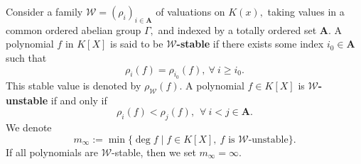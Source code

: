 \documentclass[11pt]{amsart}
\theoremstyle{definition}
\theoremstyle{remark}
\numberwithin{equation}{section}
\begin{document}
Consider a family $\mathcal{W}=(\rho_i)_{i\in\mathbf{A}}$ of valuations on $K(x),$  taking values in a common ordered abelian group $\Gamma,$   and indexed by a totally ordered set $\mathbf{A}.$ 
A polynomial $f$ in $K[X]$ is said to be {\bf $\mathcal{W}$-stable}  if there exists some index $i_0\in\mathbf{A}$ such that
$$\rho_i(f)=\rho_{i_0}(f),~ \forall~ i\geq i_0.$$  This stable value is denoted by $\rho_\mathcal{W}(f).$
%
A polynomial $f\in K[X]$  is {\bf $\mathcal{W}$-unstable} if and only if  
$$\rho_i(f)<\rho_j(f),\hspace{5pt} \forall~ i<j\in\mathbf{A}.$$  
We denote 
$$m_{\infty}:=\min\{\deg f\mid f\in K[X],~\text{$f$ is $\mathcal{W}$-unstable}\}.$$ If  all polynomials are $\mathcal{W}$-stable, then we set $m_{\infty}=\infty$. 
\end{document}
